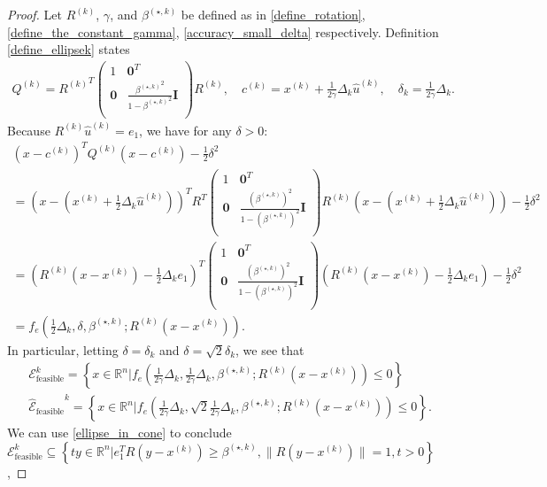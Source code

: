 \documentclass{article}
\theoremstyle{case}
\numberwithin{theorem}{subsection}
\newcommand{\bs}{{\beta^{(\star, k)}}}
\newcommand{\ck}{{c^{(k)}}}
\newcommand{\dk}{\Delta_k}
\newcommand{\huk}{{{\hat u}^{(k)}}}
\newcommand{\qk}{{Q^{(k)}}}
\newcommand{\Rn}{\mathbb R^n}
\newcommand{\rotk}{{R^{(k)}}}
\newcommand{\scaledunshiftedellipsoid}{{{\mathcal {\hat E}_{\text{feasible}}}^k}}
\newcommand{\sdk}{{\delta_k}}
\newcommand{\unshiftedellipsoid}{{\mathcal E^k_{\textrm{feasible}}}}
\newcommand{\xk}{{x^{(k)}}}
\begin{document}
\begin{proof}
Let $\rotk$, $\gamma$, and $\bs$ be defined as in \cref{define_rotation}, \cref{define_the_constant_gamma}, \cref{accuracy_small_delta} respectively.
Definition \cref{define_ellipsek} states
\begin{align*}
\qk = \rotk^T \begin{pmatrix}
1 & \boldsymbol0^T \\
\boldsymbol 0 & \frac{\bs^2}{1 - \bs^2} \boldsymbol I \\
\end{pmatrix} \rotk, \quad
\ck = \xk  + \frac 1 {2\gamma} \dk\huk, \quad
\sdk = \frac 1 {2\gamma} \dk.
\end{align*}
Because $\rotk\huk = e_1$, we have for any $\delta > 0$:
\begin{align*}
\left(x - \ck\right)^T\qk\left(x - \ck\right) - \frac 1 2 \delta^2 \\
= \left(x - \left(\xk + \frac 1 2 \dk \huk\right)\right)^TR^T\begin{pmatrix}
1 & \boldsymbol0^T \\
\boldsymbol 0 & \frac{\left(\bs\right)^2}{1 - \left(\bs\right)^2} \boldsymbol I \\
\end{pmatrix} \rotk\left(x - \left(\xk + \frac 1 2 \dk \huk\right)\right) - \frac 1 2 \delta^2 \\
= \left(\rotk(x-\xk) - \frac 1 2 \dk e_1\right)^T\begin{pmatrix}
1 & \boldsymbol0^T \\
\boldsymbol 0 & \frac{\left(\bs\right)^2}{1 - \left(\bs\right)^2} \boldsymbol I \\
\end{pmatrix} \left(\rotk(x-\xk) - \frac 1 2 \dk e_1\right) - \frac 1 2 \delta^2 \\
= f_e\left(\frac 1 2 \dk, \delta, \bs; \rotk\left(x - \xk\right)\right).
\end{align*}
In particular, letting $\delta = \sdk$ and $\delta = \sqrt{2}\sdk$, we see that
\begin{align*}
\unshiftedellipsoid = \left\{x \in \Rn | f_e\left(\frac 1 {2\gamma} \dk, \frac 1 {2\gamma} \dk, \bs; \rotk\left(x - \xk\right)\right) \le 0 \right\} \\
\scaledunshiftedellipsoid = \left\{x \in \Rn | f_e\left(\frac 1 {2\gamma} \dk, \sqrt{2} \frac {1}{2\gamma}\dk, \bs; \rotk\left(x - \xk\right)\right) \le 0 \right\}.
\end{align*}
We can use \cref{ellipse_in_cone} to conclude
$\unshiftedellipsoid \subseteq \left\{t y \in \Rn | e_1^TR\left(y - \xk\right) \ge \bs, \|R\left(y - \xk\right)\| = 1, t > 0 \right\}$,

\end{proof}
\end{document}
